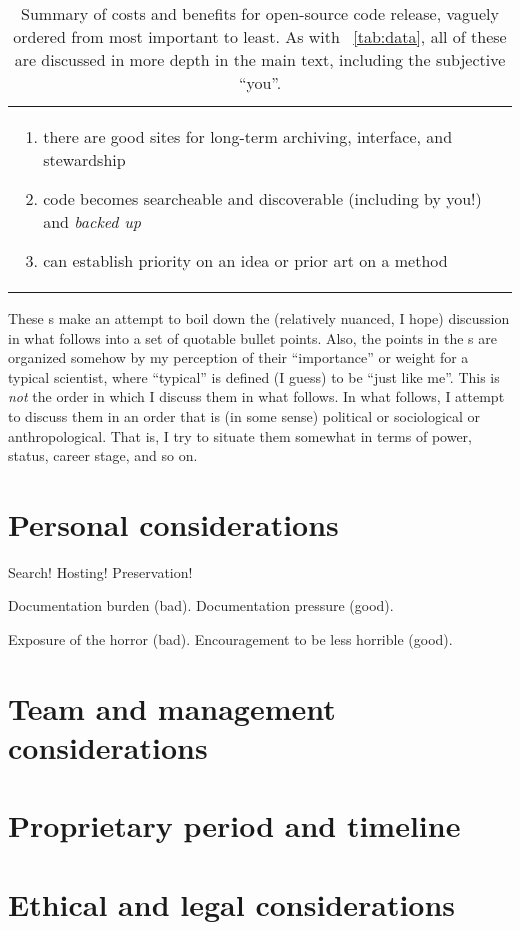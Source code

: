 \documentclass[12pt,twoside,pdftex]{article}
\begin{document}
\begin{table}
\begin{tabular}{@{}p{\cwidth}|p{\cwidth}@{}}
\begin{enumerate}
\item there are good sites for long-term archiving, interface, and stewardship
\item code becomes searcheable and discoverable (including by you!) and \emph{backed up}
\item can establish priority on an idea or prior art on a method
\end{enumerate}\end{tabular}
\caption{Summary of costs and benefits for open-source code release,
  vaguely ordered from most important to least. As with
  \tablename~\ref{tab:data}, all of these are discussed in more depth
  in the main text, including the subjective ``you''.\label{tab:code}}
\end{table}

These \tablename s make an attempt to boil down the (relatively nuanced, I
hope) discussion in what follows into a set of quotable bullet points.
Also, the points in the \tablename s are organized somehow by my
perception of their ``importance'' or weight for a typical scientist,
where ``typical'' is defined (I guess) to be ``just like me''.
This is \emph{not} the order in which I discuss them in what follows.
In what follows, I attempt to discuss them in an order that is (in
some sense) political or sociological or anthropological.
That is, I try to situate them somewhat in terms of power, status,
career stage, and so on.

\section{Personal considerations}

Search! Hosting! Preservation!

Documentation burden (bad). Documentation pressure (good).

Exposure of the horror (bad). Encouragement to be less horrible (good).

\section{Team and management considerations}

\section{Proprietary period and timeline}

\section{Ethical and legal considerations}
\end{document}

